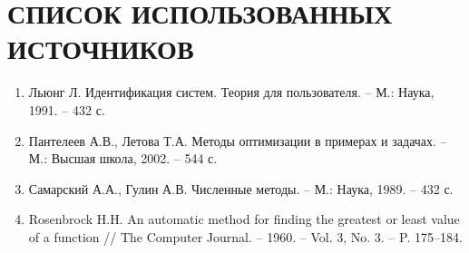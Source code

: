 \newpage
\part*{СПИСОК ИСПОЛЬЗОВАННЫХ ИСТОЧНИКОВ}
    \begin{enumerate}
        \item Льюнг Л. Идентификация систем. Теория для пользователя. -- М.: Наука, 1991. -- 432 с.
        \item Пантелеев А.В., Летова Т.А. Методы оптимизации в примерах и задачах. -- М.: Высшая школа, 2002. -- 544 с.
        \item Самарский А.А., Гулин А.В. Численные методы. -- М.: Наука, 1989. -- 432 с.
        \item Rosenbrock H.H. An automatic method for finding the greatest or least value of a function // The Computer Journal. -- 1960. -- Vol. 3, No. 3. -- P. 175--184.
    \end{enumerate}
